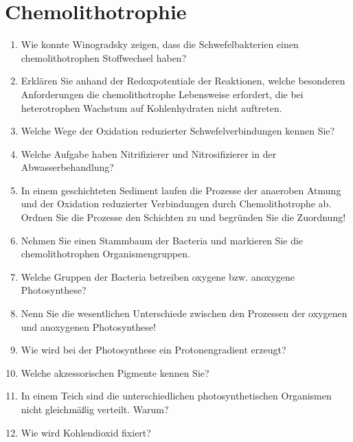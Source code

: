
\section{Chemolithotrophie}
	\begin{enumerate}
		\item Wie konnte Winogradsky zeigen, dass die Schwefelbakterien einen chemolithotrophen Stoffwechsel haben?
		\item Erklären Sie anhand der Redoxpotentiale der Reaktionen, welche besonderen Anforderungen die chemolithotrophe Lebensweise erfordert, die bei heterotrophen Wachstum auf Kohlenhydraten nicht auftreten.
		\item Welche Wege der Oxidation reduzierter Schwefelverbindungen kennen Sie?
		\item Welche Aufgabe haben Nitrifizierer und Nitrosifizierer in der Abwasserbehandlung?
		\item In einem geschichteten Sediment laufen die Prozesse der anaeroben Atmung und der Oxidation reduzierter Verbindungen durch Chemolithotrophe ab. Ordnen Sie die Prozesse den Schichten zu und begründen Sie die Zuordnung!
		\item Nehmen Sie einen Stammbaum der Bacteria und markieren Sie die chemolithotrophen Organismengruppen. 
		\item Welche Gruppen der Bacteria betreiben oxygene bzw. anoxygene Photosynthese?
		\item Nenn Sie die wesentlichen Unterschiede zwischen den Prozessen der oxygenen und anoxygenen Photosynthese!
		\item Wie wird bei der Photosynthese ein Protonengradient erzeugt?
		\item Welche akzessorischen Pigmente kennen Sie? 
		\item In einem Teich sind die unterschiedlichen photosynthetischen Organismen nicht gleichmäßig verteilt. Warum?
		\item Wie wird Kohlendioxid fixiert?
	\end{enumerate}
